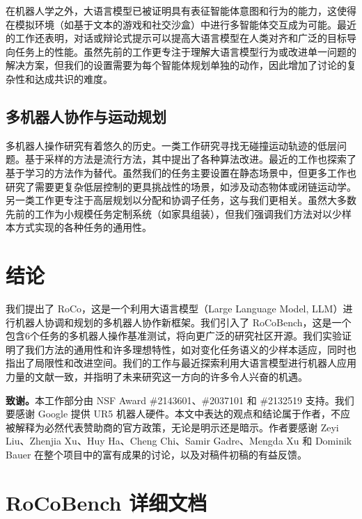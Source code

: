 \documentclass[UTF8, a4paper, 12pt]{article}
\begin{document}
在机器人学之外，大语言模型已被证明具有表征智能体意图和行为的能力，这使得在模拟环境（如基于文本的游戏和社交沙盒）中进行多智能体交互成为可能。最近的工作还表明，对话或辩论式提示可以提高大语言模型在人类对齐和广泛的目标导向任务上的性能。虽然先前的工作更专注于理解大语言模型行为或改进单一问题的解决方案，但我们的设置需要为每个智能体规划单独的动作，因此增加了讨论的复杂性和达成共识的难度。

\subsection{多机器人协作与运动规划}

多机器人操作研究有着悠久的历史。一类工作研究寻找无碰撞运动轨迹的低层问题。基于采样的方法是流行方法，其中提出了各种算法改进。最近的工作也探索了基于学习的方法作为替代。虽然我们的任务主要设置在静态场景中，但更多工作也研究了需要更复杂低层控制的更具挑战性的场景，如涉及动态物体或闭链运动学。另一类工作更专注于高层规划以分配和协调子任务，这与我们更相关。虽然大多数先前的工作为小规模任务定制系统（如家具组装），但我们强调我们方法对以少样本方式实现的各种任务的通用性。

\section{结论}

我们提出了 RoCo，这是一个利用大语言模型（Large Language Model, LLM）进行机器人协调和规划的多机器人协作新框架。我们引入了 RoCoBench，这是一个包含6个任务的多机器人操作基准测试，将向更广泛的研究社区开源。我们实验证明了我们方法的通用性和许多理想特性，如对变化任务语义的少样本适应，同时也指出了局限性和改进空间。我们的工作与最近探索利用大语言模型进行机器人应用力量的文献一致，并指明了未来研究这一方向的许多令人兴奋的机遇。

\textbf{致谢。}本工作部分由 NSF Award \#2143601、\#2037101 和 \#2132519 支持。我们要感谢 Google 提供 UR5 机器人硬件。本文中表达的观点和结论属于作者，不应被解释为必然代表赞助商的官方政策，无论是明示还是暗示。作者要感谢 Zeyi Liu、Zhenjia Xu、Huy Ha、Cheng Chi、Samir Gadre、Mengda Xu 和 Dominik Bauer 在整个项目中的富有成果的讨论，以及对稿件初稿的有益反馈。

\newpage



\appendix

\section{RoCoBench 详细文档}
\end{document}

